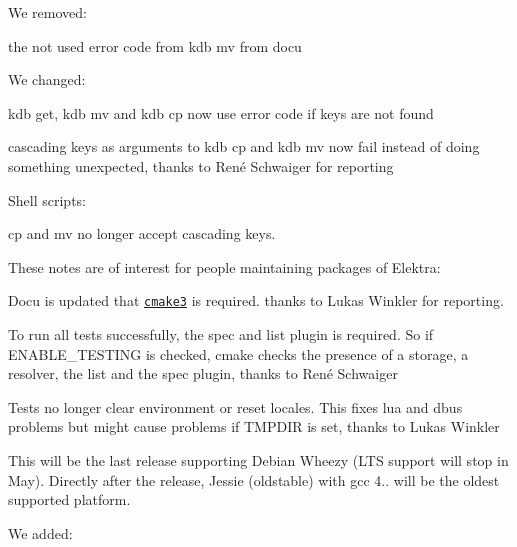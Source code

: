 We removed\+:


\begin{DoxyItemize}
\item the not used error code {} from {\ttfamily kdb mv} from docu
\end{DoxyItemize}

We changed\+:


\begin{DoxyItemize}
\item {\ttfamily kdb get}, {\ttfamily kdb mv} and {\ttfamily kdb cp} now use error code {} if keys are not found
\item cascading keys as arguments to {\ttfamily kdb cp} and {\ttfamily kdb mv} now fail instead of doing something unexpected, thanks to René Schwaiger for reporting
\end{DoxyItemize}

Shell scripts\+:


\begin{DoxyItemize}
\item cp and mv no longer accept cascading keys.
\end{DoxyItemize}

These notes are of interest for people maintaining packages of Elektra\+:


\begin{DoxyItemize}
\item Docu is updated that \href{https://cmake.org/cmake/help/v3.0/}{\tt cmake3} is required. thanks to Lukas Winkler for reporting.
\item To run all tests successfully, the {\ttfamily spec} and {\ttfamily list} plugin is required. So if {\ttfamily E\+N\+A\+B\+L\+E\+\_\+\+T\+E\+S\+T\+I\+NG} is checked, cmake checks the presence of a storage, a resolver, the list and the spec plugin, thanks to René Schwaiger
\item Tests no longer clear environment or reset locales. This fixes lua and dbus problems but might cause problems if T\+M\+P\+D\+IR is set, thanks to Lukas Winkler
\item This will be the last release supporting Debian Wheezy (L\+TS support will stop in May). Directly after the release, Jessie (oldstable) with gcc 4.. will be the oldest supported platform.
\end{DoxyItemize}

We added\+:


